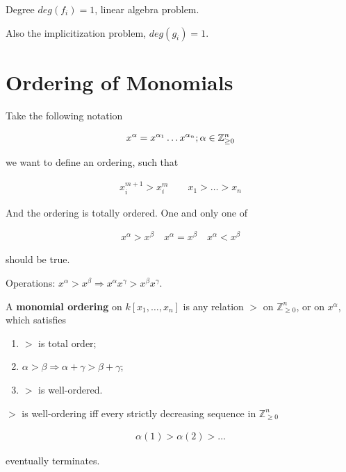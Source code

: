 \documentclass[Total.tex]{subfiles}
\begin{document}
			\begin{example}
				Degree $deg(f_i)=1$, linear algebra problem.
				
				Also the implicitization problem, $deg(g_i)=1$.
			\end{example}
			
			
			\section{Ordering of Monomials}
			
				Take the following notation 
				
				\begin{gather*}
					x^\alpha=x^{\alpha_1}\dots x^{\alpha_n};\alpha\in \mathbb{Z}^n_{\geq 0}
				\end{gather*}
				
				we want to define an ordering, such that
				
				\begin{gather*}
					x_i^{m+1}>x_i^m\qquad x_1>\dots>x_n
				\end{gather*}
				
				And the ordering is totally ordered. One and only one of
				
				\begin{gather*}
					x^\alpha>x^\beta\quad x^\alpha=x^\beta\quad x^\alpha<x^\beta
				\end{gather*}
				
				should be true. 
				
				Operations: $x^\alpha>x^\beta\Rightarrow x^\alpha x^\gamma>x^\beta x^\gamma$.
			
				\begin{Def}
					A \textbf{monomial ordering} on $k[x_1,\dots,x_n]$ is any relation $>$ on $\mathbb{Z}^n_{\geq 0}$, or on $x^\alpha$, which satisfies
					
					\begin{enumerate}
						\item $>$ is total order;
						
						\item $\alpha>\beta\Rightarrow \alpha+\gamma>\beta+\gamma$;
						
						\item $>$ is well-ordered.
					\end{enumerate}
				\end{Def}
				
				\begin{lemma}
					$>$ is well-ordering iff every strictly decreasing sequence in $\mathbb{Z}^n_{\geq 0}$ 
					
					\begin{gather*}
						\alpha(1)>\alpha(2)>\dots
					\end{gather*}
					
					eventually terminates.
				\end{lemma}
				
\end{document}
